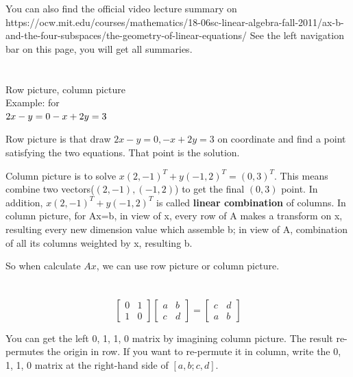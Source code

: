 \documentclass{article}
\begin{document}
\begin{spacing}{1.5}

You can also find the official video lecture summary on https://ocw.mit.edu/courses/mathematics/18-06sc-linear-algebra-fall-2011/ax-b-and-the-four-subspaces/the-geometry-of-linear-equations/  \qquad See the left navigation bar on this page, you will get all summaries.

\section{}
Row picture, column picture\\
Example: for\\
	$2x-y=0\\
	-x+2y=3$
	
Row picture is that draw $2x-y=0, -x+2y=3$ on coordinate and find a point satisfying the two equations. That point is the solution.

Column picture is to solve $x(2, -1)^T + y(-1, 2)^T = (0, 3)^T$. This means combine two vectors($(2, -1), (-1, 2)$) to get the final $(0,3)$ point. In addition, $x(2, -1)^T + y(-1, 2)^T$ is called {\bfseries linear combination} of columns. In column picture, for Ax=b, in view of x, every row of A makes a transform on x, resulting every new dimension value which assemble b; in view of A, combination of all its columns weighted by x, resulting b. 

So when calculate $Ax$, we can use row picture or column picture. 


\section{}
$$
\begin{bmatrix}
0 & 1 \\
1 & 0 
\end{bmatrix}
\begin{bmatrix}
a & b\\
c & d
\end{bmatrix}
=
\begin{bmatrix}
c & d \\
a & b
\end{bmatrix}
$$ 

You can get the left 0, 1, 1, 0 matrix by imagining column picture.
The result re-permutes the origin in row. If you want to re-permute it in column, write the 0, 1, 1, 0 matrix at the right-hand side of $[a, b; c, d]$.



\end{spacing}
\end{document}
